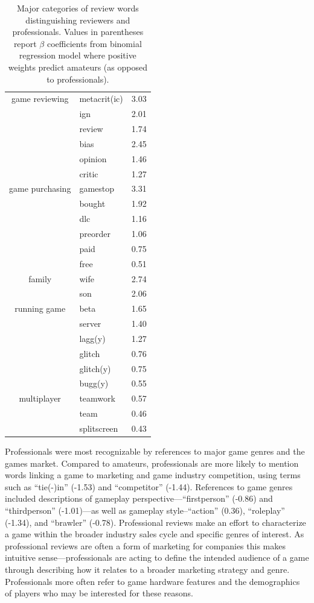\documentclass[letterpaper]{article}
\begin{document}
\begin{table}[tb]
\begin{tabularx}{\linewidth}{|c|Xc|}
\hline game reviewing 
& metacrit(ic) & 3.03 \\ 
& ign & 2.01 \\ 
& review & 1.74 \\ 
& bias & 2.45 \\ 
& opinion & 1.46 \\ 
& critic & 1.27 \\ 

\hline game purchasing 
& gamestop & 3.31 \\ 
& bought & 1.92 \\ 
& dlc & 1.16 \\ 
& preorder & 1.06 \\ 
& paid & 0.75 \\ 
& free & 0.51 \\ 

\hline family 
& wife & 2.74 \\ 
& son & 2.06 \\ 

\hline running game 
& beta & 1.65 \\ 
& server & 1.40 \\ 
& lagg(y) & 1.27 \\ 
& glitch & 0.76 \\ 
& glitch(y) & 0.75 \\ 
& bugg(y) & 0.55 \\ 

\hline multiplayer 
& teamwork & 0.57 \\ 
& team & 0.46 \\ 
& splitscreen & 0.43 \\
\hline 
\end{tabularx}
\caption{Major categories of review words distinguishing reviewers and professionals. Values in parentheses report $\beta$ coefficients from binomial regression model where positive weights predict amateurs (as opposed to professionals).}
\label{tab:user_classification_coef}
\end{table}

Professionals were most recognizable by references to major game genres and the games market. Compared to amateurs, professionals are more likely to mention words linking a game to marketing and game industry competition, using terms such as ``tie(-)in'' (-1.53) and ``competitor'' (-1.44). References to game genres included descriptions of gameplay perspective---``firstperson'' (-0.86) and ``thirdperson'' (-1.01)---as well as gameplay style--``action'' (0.36), ``roleplay'' (-1.34),  and ``brawler'' (-0.78). Professional reviews make an effort to characterize a game within the broader industry sales cycle and specific genres of interest. As professional reviews are often a form of marketing for companies this makes intuitive sense---professionals are acting to define the intended audience of a game through describing how it relates to a broader marketing strategy and genre. Professionals more often refer to game hardware features and the demographics of players who may be interested for these reasons.
\end{document}
